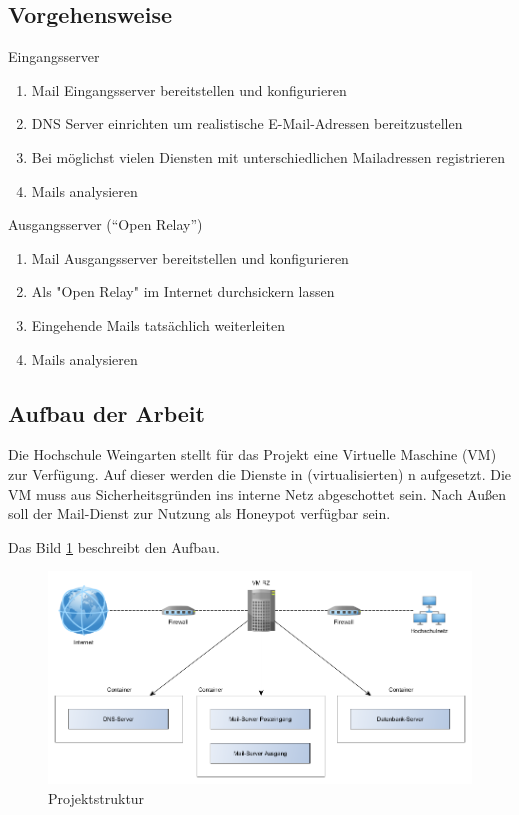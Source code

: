 \documentclass[a4paper,11pt,singlespacing]{article}
\begin{document}
	\subsection{Vorgehensweise}\label{sec:EinleitungVorgehensweise}
		Eingangsserver
		\begin{enumerate}
		\item Mail Eingangsserver bereitstellen und konfigurieren
		\item DNS Server einrichten um realistische E-Mail-Adressen bereitzustellen
		\item Bei möglichst vielen Diensten mit unterschiedlichen Mailadressen registrieren
		\item Mails analysieren
		\end{enumerate}

		Ausgangsserver ("`Open Relay"') %
		\begin{enumerate}
		\item Mail Ausgangsserver bereitstellen und konfigurieren
		\item Als "Open Relay" im Internet durchsickern lassen %
		\item Eingehende Mails tatsächlich weiterleiten
		\item Mails analysieren
		\end{enumerate}

	\subsection{Aufbau der Arbeit}\label{sec:EinleitungAufbau}
		Die Hochschule Weingarten stellt für das Projekt eine Virtuelle Maschine (VM) zur Verfügung. %
		Auf dieser werden die Dienste in (virtualisierten) n aufgesetzt.
		Die VM muss aus Sicherheitsgründen ins interne Netz abgeschottet sein.
		Nach Außen soll der Mail-Dienst zur Nutzung als Honeypot verfügbar sein.

		Das Bild \ref{fig:Hierarchy} beschreibt den Aufbau.

		\begin{figure}
		\includegraphics[width=\linewidth]{2-Hierarchy.png}
		\caption{Projektstruktur}
		\label{fig:Hierarchy}
		\end{figure}
\end{document}
